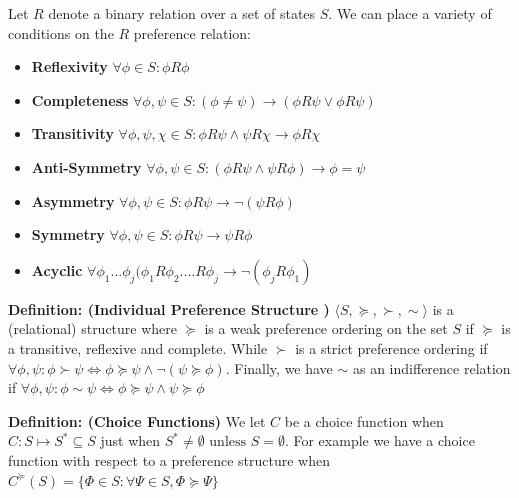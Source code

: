 \documentclass{tufte-handout}
\begin{document}
\begin{fullwidth}
\begin{example}
	Let $R$ denote a binary relation over a set of states $S$.
We can place a variety of conditions on the $R$ preference relation:
	\begin{itemize}
	\item \textbf{Reflexivity} $\forall \phi \in S: \phi R \phi $
	\item \textbf{Completeness} $\forall \phi, \psi \in S: (\phi \neq \psi) \rightarrow (\phi R \psi \vee \phi R \psi)$
	\item \textbf{Transitivity} $\forall \phi, \psi, \chi \in S: \phi R \psi \wedge \psi R \chi \rightarrow \phi R \chi$
	\item \textbf{Anti-Symmetry} $\forall \phi, \psi \in S: (\phi R \psi  \wedge \psi R \phi) \rightarrow \phi = \psi$
	\item \textbf{Asymmetry} $\forall \phi, \psi \in S: \phi R \psi \rightarrow \neg(\psi R \phi) $
	\item \textbf{Symmetry} $\forall \phi, \psi \in S: \phi R \psi \rightarrow \psi R \phi $
	\item \textbf{Acyclic} $\forall \phi_{1} ... \phi_{j} ( \phi_{1} R \phi_{2} .... R \phi_{j} \rightarrow \neg(\phi_{j} R \phi_{1})$
	\end{itemize}
\vspace{\baselineskip}

\textbf{Definition: (Individual Preference Structure )} $\langle S, \succeq, \succ, \sim \rangle$ is a (relational) structure where $\succeq$ is a weak preference ordering on the set $S$ if $\succeq$ is a transitive, reflexive and complete. While $\succ$ is a strict preference ordering  if ${\forall \phi, \psi :  \phi \succ \psi  \Leftrightarrow \phi \succeq \psi \wedge \neg(\psi \succeq \phi)}$. Finally, we have $ \sim$ as an indifference relation if ${ \forall \phi, \psi : \phi  \sim \psi \Leftrightarrow \phi \succeq \psi \wedge \psi \succeq \phi}$
\linebreak

\textbf{Definition: (Choice Functions)} We let \textbf{$C$} be a choice function when ${C: S \mapsto S^{*} \subseteq S}$ just when  ${S^{*} \neq \emptyset  \text{ unless } S = \emptyset }$. For example we have a choice function with respect to a preference structure when  ${C^{\succeq}(S) = \{ \Phi \in S :  \forall \Psi \in S, \Phi \succeq \Psi  \}}$ 
\linebreak

\end{example}
\end{fullwidth}
\end{document}
